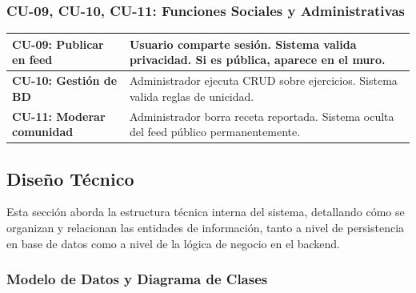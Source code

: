 \documentclass[12pt]{article}
\begin{document}
\subsubsection{CU-09, CU-10, CU-11: Funciones Sociales y Administrativas}
\begin{table}[h!]
    \centering
    \renewcommand{\arraystretch}{1.3}
    \begin{tabular}{|p{4.5cm}|p{10.5cm}|}
        \hline
        \rowcolor[HTML]{EFEFEF} 
        \textbf{CU-09: Publicar en feed} & Usuario comparte sesión. Sistema valida privacidad. Si es pública, aparece en el muro. \\ \hline
        \textbf{CU-10: Gestión de BD} & Administrador ejecuta CRUD sobre ejercicios. Sistema valida reglas de unicidad. \\ \hline
        \textbf{CU-11: Moderar comunidad} & Administrador borra receta reportada. Sistema oculta del feed público permanentemente. \\ \hline
    \end{tabular}
\end{table}
\subsection{Diseño Técnico}
Esta sección aborda la estructura técnica interna del sistema, detallando cómo se organizan y relacionan las entidades de información, tanto a nivel de persistencia en base de datos como a nivel de la lógica de negocio en el backend.
\newpage
\subsubsection{Modelo de Datos y Diagrama de Clases}
\end{document}
